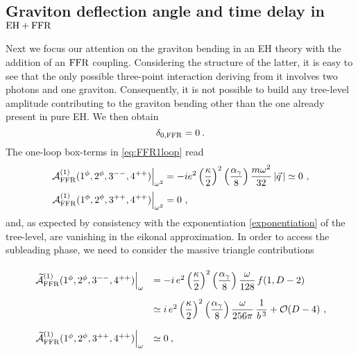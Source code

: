 \documentclass[a4paper,11pt]{article}
\numberwithin{equation}{section}
\newcommand{\cA}{\mathcal{A}}
\newcommand{\cO}{\mathcal{O}}
\def\cA{\mathcal{A}}
\begin{document}
\subsection{Graviton deflection angle and time delay in \texorpdfstring{${\rm EH} + {\rm FFR}$}{EH + FFR}}\label{sec:FFRgraviton}

Next we focus our attention on the graviton bending in an EH theory with the addition of an $\rm FFR$ coupling. Considering the structure of the latter, it is easy to see that the only possible three-point interaction deriving from it involves two photons and one graviton. Consequently, it is not possible to build any tree-level amplitude contributing to the graviton bending other than the one already present in pure EH. We then obtain
\begin{equation}
\delta_{0,{\rm FFR}} = 0 \>.
\end{equation}
The one-loop box-terms in \eqref{eq:FFR1loop} read  
\begin{equation}
    \begin{split}
        \left. \cA^{(1)}_{\rm FFR} (1^\phi,2^\phi,3^{--},4^{++})\right|_{\omega^2} &= - i e^2 \left( \frac{\kappa}{2}\right)^2 \left( \frac{\alpha_\gamma}{8} \right) \frac{m \omega^2}{32} \left| \vec{q} \, \right|  \simeq 0 \ ,\\[.2em]
        \left. \cA^{(1)}_{\rm FFR} (1^\phi,2^\phi,3^{++},4^{++}) \right|_{\omega^2} &= 0\ ,
    \end{split}
\end{equation}
and, as expected by consistency with the exponentiation \eqref{exponentiation} of the tree-level, are vanishing in the eikonal approximation. In order to access the subleading phase, we need to consider the massive triangle contributions
\begin{equation}
\def\arraystretch{2.5}
\begin{array}{rl}
    \left. \widetilde{\cA}^{(1)}_{\rm FFR} (1^\phi,2^\phi,3^{--},4^{++}) \right|_{\omega} &=	-i \, e^2 \left( \dfrac{\kappa}{2}\right)^2 \left( \dfrac{\alpha_\gamma}{8} \right) \dfrac{\omega}{128} \, f(1,D-2)	\\
    				&\simeq i \, e^2 \left( \dfrac{\kappa}{2}\right)^2 \left( \dfrac{\alpha_\gamma}{8} \right) \dfrac{\omega}{256 \pi}\, \dfrac{1}{b^{\, 3}} +\cO(D-4) \ , \\
     \left. \widetilde{\cA}^{(1)}_{\rm FFR} (1^\phi,2^\phi,3^{++},4^{++}) \right|_{\omega} &\simeq 0 \> ,
\end{array}
\end{equation}
\end{document}

